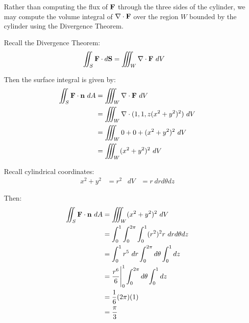 \begin{solution}
    Rather than computing the flux of \(\vb{F}\) through the three sides of the cylinder, we may compute the volume integral of \(\nabla \cdot \vb{F}\) over the region \(W\) bounded by the cylinder using the Divergence Theorem.
    
    Recall the Divergence Theorem:
    \begin{align}
        \iint_S \vb{F} \cdot d\vb{S} &= \iiint_W \nabla \cdot \vb{F} \ dV
    \end{align}
    
    Then the surface integral is given by:
    \begin{align*}
        \iint_{S} \vb{F} \cdot \vb{n} \ dA &= \iiint_W \nabla \cdot \vb{F} \ dV \\
        &= \iiint_W \nabla \cdot (1, 1, z(x^2 + y^2)^2) \ dV \\
        &= \iiint_W 0 + 0 + (x^2 + y^2)^2 \ dV \\
        &= \iiint_W (x^2 + y^2)^2 \ dV 
    \end{align*}
    
    Recall cylindrical coordinates:
    \begin{align}
        x^2 + y^2 &= r^2 & dV &= r \ dr d\theta dz
    \end{align}
    
    Then:
    \begin{align*}
        \iint_{S} \vb{F} \cdot \vb{n} \ dA &= \iiint_W (x^2 + y^2)^2 \ dV \\
        &= \int_0^1 \int_0^{2\pi} \int_0^1 (r^2)^2 r \ dr d\theta dz \\
        &= \int_0^1 r^5 \ dr \int_0^{2\pi} d\theta \int_0^1 dz \\
        &= \frac{r^6}{6} \Biggr|_0^1 \int_0^{2\pi} d\theta \int_0^1 dz \\
        &= \frac{1}{6} (2\pi) (1) \\
        &= \frac{\pi}{3}
    \end{align*}
\end{solution}
